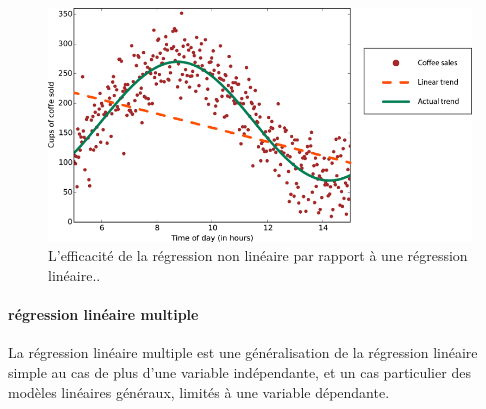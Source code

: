 	
	\begin{figure}[H]%
		\centering
		\includegraphics[width=\textwidth]{images/nonlinear-trend.png}
		\caption{ L'efficacité de la régression non linéaire par rapport \`{a} une régression linéaire..}
		\label{fig:nonlinear_trend}
	\end{figure}
	
	\paragraph*{régression linéaire multiple}
	La régression linéaire multiple est une généralisation de la régression linéaire simple au cas de plus d'une variable indépendante, et un cas particulier des modèles linéaires généraux, limités à une variable dépendante.
	
